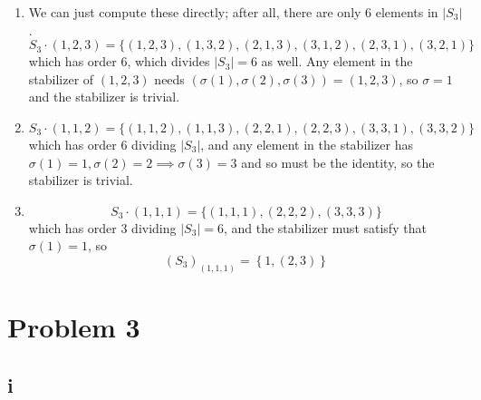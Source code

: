 \documentclass[12pt,letterpaper]{article}
\theoremstyle{definition}
\begin{document}
\begin{enumerate}
  \item We can just compute these directly; after all, there are only 6 elements in $|S_{3}|$.
        \[
          S_{3} \cdot (1,2,3) = \{(1,2,3), (1,3,2), (2,1,3), (3,1,2), (2,3,1), (3,2,1)\}
        \]
  which has order $6$, which divides $|S_{3}| = 6$ as well. Any element in the stabilizer of $(1,2,3)$ needs $(\sigma(1), \sigma(2), \sigma(3)) = (1,2,3)$, so $\sigma = 1$ and the stabilizer is trivial.
  \item
        \[
          S_{3} \cdot (1,1,2) = \{(1,1,2), (1,1,3), (2,2,1), (2,2,3), (3,3,1), (3,3,2)\}
        \]
  which has order $6$ dividing $|S_{3}|$, and any element in the stabilizer has $\sigma(1) = 1, \sigma(2) = 2 \implies \sigma(3) = 3$ and so must be the identity, so the stabilizer is trivial.
  \item
        \[
          S_{3} \cdot (1,1,1) = \{(1,1,1), (2,2,2), (3,3,3)\}
        \]
  which has order $3$ dividing $|S_{3}| = 6$, and the stabilizer must satisfy that $\sigma(1) = 1$, so
        \[
          (S_{3})_{(1,1,1)} = \left\{1, (2,3)\right\}
        \]
\end{enumerate}

\section*{Problem 3}

\subsection*{i}
\end{document}
